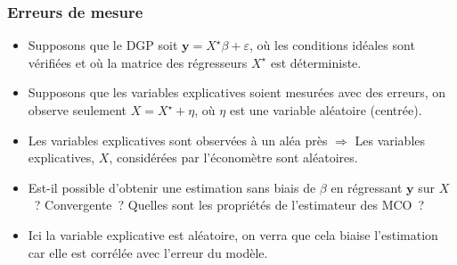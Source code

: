 \documentclass[10pt]{beamer}
\begin{document}
\begin{frame}
  \frametitle{Erreurs de mesure}

  \begin{itemize}

  \item Supposons que le DGP soit $\mathbf y = X^{\star}\beta + \varepsilon$, où
    les conditions idéales sont vérifiées et où la matrice des
    régresseurs $X^{\star}$ est déterministe.\newline

  \item Supposons que les variables explicatives soient mesurées avec des
    erreurs, on observe seulement $X = X^{\star} + \eta$, où $\eta$ est une
    variable aléatoire (centrée).\newline

  \item Les variables explicatives sont observées à un aléa
    près $\Rightarrow$ Les variables explicatives, $X$, considérées par
    l'économètre sont aléatoires.\newline

  \item Est-il possible d'obtenir une estimation sans biais de $\beta$ en
    régressant $\mathbf y$ sur $X$~? Convergente~? Quelles sont les propriétés
    de l'estimateur des MCO~?\newline

  \item Ici la variable explicative est aléatoire, on verra que cela biaise
    l'estimation car elle est corrélée avec l'erreur du modèle.

  \end{itemize}

\end{frame}
\end{document}
